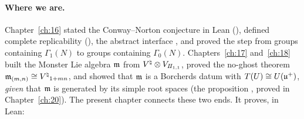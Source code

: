 \paragraph{Where we are.}  Chapter~\ref{ch:16} stated the Conway--Norton conjecture in Lean
(), defined complete replicability (), the abstract interface
, and proved the step from groups containing $\Gamma_1(N)$ to groups containing $\Gamma_0(N)$.
Chapters~\ref{ch:17} and~\ref{ch:18} built the Monster Lie algebra $\mathfrak{m}$ from ${V^{\natural}}\otimes V_{I\!I_{1,1}}$, proved
the no-ghost theorem $\mathfrak{m}_{(m,n)}\cong{V^{\natural}}_{1+mn}$, and showed that $\mathfrak{m}$ is a Borcherds datum with
$T(U)\cong U(\mathfrak{u}^+)$, \emph{given} that $\mathfrak{m}$ is generated by its simple root spaces (the proposition
, proved in Chapter~\ref{ch:20}).  The present chapter connects these two ends.
It proves, in Lean:
